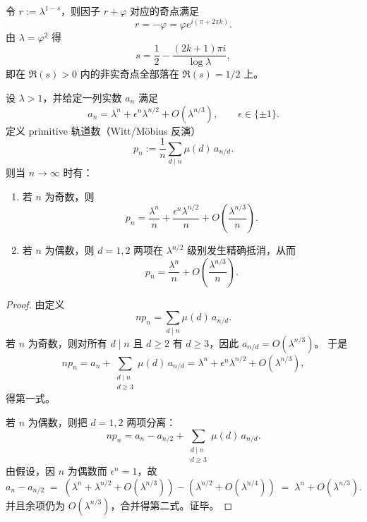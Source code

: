 \begin{remark}
令 $r:=\lambda^{1-s}$，则因子 $r+\varphi$ 对应的奇点满足
\[
r=-\varphi=\varphi e^{i(\pi+2\pi k)}.
\]
由 $\lambda=\varphi^2$ 得
\[
s=\frac12-\frac{(2k+1)\pi i}{\log\lambda},
\]
即在 $\Re(s)>0$ 内的非实奇点全部落在 $\Re(s)=1/2$ 上。
\end{remark}

\begin{proposition}\label{prop:finite-rh-parity-general}
设 \(\lambda>1\)，并给定一列实数 \(a_n\) 满足
\[
a_n=\lambda^n+\epsilon^n\lambda^{n/2}+O(\lambda^{n/3}),
\qquad \epsilon\in\{\pm 1\}.
\]
定义 primitive 轨道数（Witt/Möbius 反演）
\[
p_n:=\frac{1}{n}\sum_{d\mid n}\mu(d)\,a_{n/d}.
\]
则当 \(n\to\infty\) 时有：
\begin{enumerate}
  \item 若 \(n\) 为奇数，则
  \[
  p_n=\frac{\lambda^n}{n}+\frac{\epsilon^n\lambda^{n/2}}{n}+O\!\left(\frac{\lambda^{n/3}}{n}\right).
  \]
  \item 若 \(n\) 为偶数，则 \(d=1,2\) 两项在 \(\lambda^{n/2}\) 级别发生精确抵消，从而
  \[
  p_n=\frac{\lambda^n}{n}+O\!\left(\frac{\lambda^{n/3}}{n}\right).
  \]
\end{enumerate}
\end{proposition}
\begin{proof}
由定义
\[
np_n=\sum_{d\mid n}\mu(d)\,a_{n/d}.
\]
若 \(n\) 为奇数，则对所有 \(d\mid n\) 且 \(d\ge 2\) 有 \(d\ge 3\)，因此
\(
a_{n/d}=O(\lambda^{n/3})
\)。
于是
\[
np_n=a_n+\sum_{\substack{d\mid n\\ d\ge 3}}\mu(d)\,a_{n/d}
=\lambda^n+\epsilon^n\lambda^{n/2}+O(\lambda^{n/3}),
\]
得第一式。
\par
若 \(n\) 为偶数，则把 \(d=1,2\) 两项分离：
\[
np_n=a_n-a_{n/2}+\sum_{\substack{d\mid n\\ d\ge 3}}\mu(d)\,a_{n/d}.
\]
由假设，因 \(n\) 为偶数而 \(\epsilon^n=1\)，故
\[
a_n-a_{n/2}
\;=\;
(\lambda^n+\lambda^{n/2}+O(\lambda^{n/3}))-(\lambda^{n/2}+O(\lambda^{n/4}))
\;=\;
\lambda^n+O(\lambda^{n/3}).
\]
并且余项仍为 \(O(\lambda^{n/3})\)，合并得第二式。证毕。
\end{proof}

